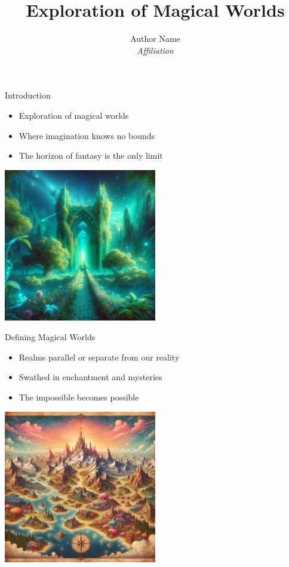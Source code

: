 \documentclass{beamer}
\title{Exploration of Magical Worlds}
\author{Author Name \\ \textit{Affiliation}}
\date{}
\begin{document}
\begin{frame}
    \titlepage
\end{frame}

\begin{frame}{Introduction}
    \begin{itemize}
        \item Exploration of magical worlds
        \item Where imagination knows no bounds
        \item The horizon of fantasy is the only limit
    \end{itemize}
    \begin{center}
        \includegraphics[width=0.5\textwidth]{./images/introduction.png}
    \end{center}
\end{frame}

\begin{frame}{Defining Magical Worlds}
    \begin{itemize}
        \item Realms parallel or separate from our reality
        \item Swathed in enchantment and mysteries
        \item The impossible becomes possible
    \end{itemize}
    \begin{center}
        \includegraphics[width=0.5\textwidth]{./images/defining.png}
    \end{center}
\end{frame}
\end{document}
